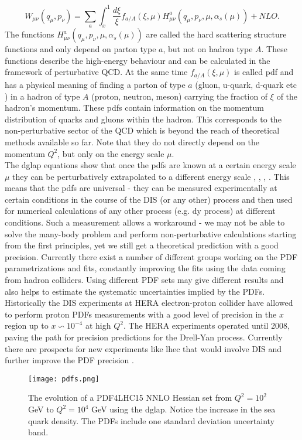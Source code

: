 			\begin{equation}
		W_{\mu \nu}(q_{\mu},p_{\nu})=\sum_{a} \int_{x}^{1}\frac{d\xi}{\xi} f_{a/A}(\xi,\mu) H^a_{\mu\nu}(q_{\mu},p_{\nu},\mu,\alpha_s(\mu)) + NLO.
		\end{equation}
		The functions $H^a_{\mu\nu}(q_{\mu},p_{\nu},\mu,\alpha_s(\mu))$ are called the hard scattering structure functions and only depend on parton type $a$, but not on hadron type $A$. These functions describe the high-energy behaviour and can be calculated in the framework of perturbative QCD. At the same time $f_{a/A}(\xi,\mu)$ is called \gls{pdf} and has a physical meaning of finding a parton of type $a$ (gluon, u-quark, d-quark etc ) in a hadron of type $A$ (proton, neutron, meson) carrying the fraction of $\xi$ of the hadron's momentum. These \gls{pdf}s contain information on the momentum distribution of quarks and gluons within the hadron. This corresponds to the non-perturbative sector of the QCD which is beyond the reach of theoretical methods available so far. Note that they do not directly depend on the momentum $Q^2$, but only on the energy scale $\mu$. \\
		The \gls{dglap} equations show that once the \gls{pdf}s are known at a certain energy scale $\mu$ they can be perturbatively extrapolated to a different energy scale \cite{Lipatov:1974qm}, \cite{ALTARELLI}, \cite{Gribov:1972ri}, \cite{Dokshitzer:1977sg}. This means that the \gls{pdf}s are universal - they can be measured experimentally at certain conditions in the course of the DIS (or any other) process and then used for numerical calculations of any other process (e.g. \gls{dy} process) at different conditions. Such a measurement allows a workaround - we may not be able to solve the many-body problem and perform non-perturbative calculations starting from the first principles, yet we still get a theoretical prediction with a good precision. Currently there exist a number of different groups working on the PDF parametrizations and fits, constantly improving the fits using the data coming from hadron colliders. Using different PDF sets may give different results and also helps to estimate the systematic uncertainties implied by the PDFs. \\
		Historically the DIS experiments at HERA electron-proton collider have allowed to perform proton PDFs measurements with a good level of precision in the $x$ region up to $x \backsim 10^{-4}$ at high $Q^2$. The HERA experiments operated until 2008, paving the path for precision predictions for the Drell-Yan process.  Currently there are prospects for new experiments like \gls{lhec} that would involve DIS and further improve the PDF precision \cite{lhec}.
		\begin{figure}[htbp]
		\texttt{[image: pdfs.png]}
		\caption{The evolution of a PDF4LHC15 NNLO Hessian set from $Q^2=10^2$ GeV to $Q^2=10^4$ GeV using the \gls{dglap}. Notice the increase in the sea quark density. The PDFs include one standard deviation uncertainty band.}
		\label{fig::pdfs}
		\end{figure}
